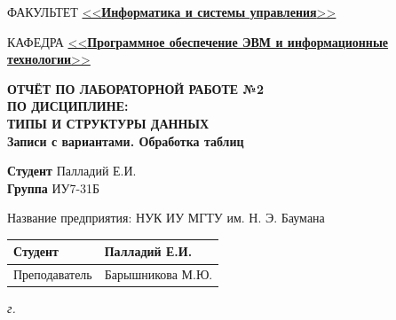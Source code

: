 \begin{titlepage}
	\begin{flushleft}
		\fontsize{12pt}{0.8\baselineskip}\selectfont 
		
		ФАКУЛЬТЕТ \uline{<<\textbf{Информатика и системы управления}>> \hfill}
		
		КАФЕДРА \uline{\mbox{\hspace{4mm}} <<\textbf{Программное обеспечение ЭВМ и информационные технологии}>> \hfill}
	\end{flushleft}
	
	\vspace{1mm}
	
	\begin{center}
		\setstretch{1.2}
		{
			\fontsize{20pt}{\baselineskip}\selectfont\bfseries
			ОТЧЁТ ПО ЛАБОРАТОРНОЙ РАБОТЕ №2 \\
			ПО ДИСЦИПЛИНЕ: \\
			ТИПЫ И СТРУКТУРЫ ДАННЫХ\\
		}
		\vspace{5mm}
		{
			\Large \bfseries
			Записи с вариантами. Обработка таблиц\\
		}
	\end{center}
	
	\vspace{1mm}
	
	\begin{flushleft}
		\textbf{Студент} \uline{\hspace{5cm}} Палладий Е.И. \\
		\vspace{5mm}
		\textbf{Группа} \uline{\hspace{5cm}} ИУ7-31Б \\
	\end{flushleft}
	
	\vspace{40mm}
	
	\begin{flushleft}
		Название предприятия: НУК ИУ МГТУ им. Н. Э. Баумана \\
	\end{flushleft}
	
	
	\begin{flushleft}
		\begin{tabular}{|p{}|p{0.45\textwidth}|}
			\hline
			Студент & \uline{\hspace{3cm}} Палладий Е.И. \\
			\hline
			Преподаватель & \uline{\hspace{3cm}} Барышникова М.Ю. \\
			\hline
		\end{tabular}
	\end{flushleft}
	
	
	\centering\textit{{\the\year} г.}
\end{titlepage}
